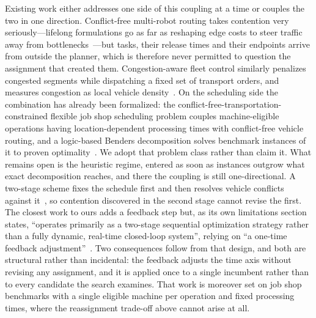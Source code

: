 \documentclass[manuscript,screen,review]{acmart}
\begin{document}
Existing work either addresses one side of this coupling at a time or couples the
two in one direction. Conflict-free multi-robot routing takes contention very
seriously---lifelong formulations go as far as reshaping edge costs to steer
traffic away from bottlenecks~\cite{zhang2024guidance}---but tasks, their release
times and their endpoints arrive from outside the planner, which is therefore
never permitted to question the assignment that created them. Congestion-aware
fleet control similarly penalizes congested segments while dispatching a fixed
set of transport orders, and measures congestion as local vehicle
density~\cite{kim2026congestion}. On the scheduling side the combination has
already been formalized: the conflict-free-transportation-constrained flexible
job shop scheduling problem couples machine-eligible operations having
location-dependent processing times with conflict-free vehicle routing, and a
logic-based Benders decomposition solves benchmark instances of it to proven
optimality~\cite{vanos2026exact}. We adopt that problem class rather than claim
it. What remains open is the heuristic regime, entered as soon as instances
outgrow what exact decomposition reaches, and there the coupling is still
one-directional. A two-stage scheme fixes the schedule first and then resolves
vehicle conflicts against it~\cite{sun2023integrated}, so contention discovered
in the second stage cannot revise the first. The closest work to ours adds a
feedback step but, as its own limitations section states, ``operates primarily as
a two-stage sequential optimization strategy rather than a fully dynamic,
real-time closed-loop system'', relying on ``a one-time feedback
adjustment''~\cite{li2026framework}. Two consequences follow from that design,
and both are structural rather than incidental: the feedback adjusts the time axis
without revising any assignment, and it is applied once to a single incumbent
rather than to every candidate the search examines. That work is moreover set on
job shop benchmarks with a single eligible machine per operation and fixed
processing times, where the reassignment trade-off above cannot arise at all.
\end{document}
